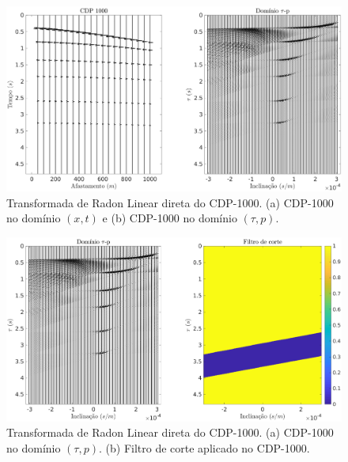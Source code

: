 \begin{landscape}
\begin{figure}[H]
\centering
\includegraphics[totalheight=14cm]{figuras/cap2/radon_ida.pdf}
\caption{Transformada de Radon Linear direta do CDP-1000. (a) CDP-1000 no domínio $(x, t)$ e (b) CDP-1000 no domínio $(\tau, p)$.}
\label{fig:radon_ida}
\end{figure}
\end{landscape}
\begin{landscape}
\begin{figure}[H]
\centering
\includegraphics[totalheight=14cm]{figuras/cap2/Cut_off_Filter.pdf}
\caption{Transformada de Radon Linear direta do CDP-1000. (a) CDP-1000 no domínio $(\tau, p)$. (b) Filtro de corte aplicado no CDP-1000.}
\label{fig:filtro_radon}
\end{figure}
\end{landscape}
